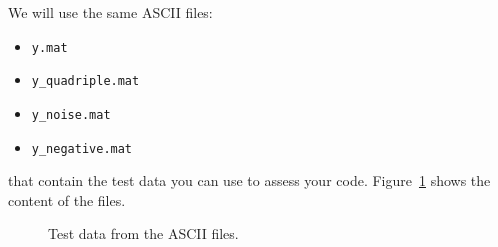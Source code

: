 \documentclass[english,a4paper,12pt,oneside]{article}
\begin{document}
We will use the same ASCII files:
\begin{itemize}
 \item \verb+y.mat+
 \item \verb+y_quadriple.mat+
 \item \verb+y_noise.mat+
 \item \verb+y_negative.mat+
\end{itemize}
that contain the test data you can use to assess your code. 
Figure~\ref{fig:test data} shows the content of the files. 
\begin{figure}[htb]
\centering
\scalebox{0.75}{}
 \caption{\label{fig:test data}Test data from the ASCII files.}
\end{figure}
% 
% 
% 
\end{document}
